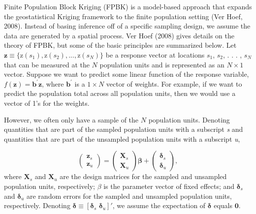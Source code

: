 \documentclass[]{elsarticle} %
\begin{document}
Finite Population Block Kriging (FPBK) is a model-based approach that
expands the geostatistical Kriging framework to the finite population
setting (Ver Hoef, 2008). Instead of basing inference off of a specific
sampling design, we assume the data are generated by a spatial process.
Ver Hoef (2008) gives details on the theory of FPBK, but some of the
basic principles are summarized below. Let
\(\mathbf{z} \equiv \{\text{z}(s_1), \text{z}(s_2), . . . , \text{z}(s_N) \}\)
be a response vector at locations \(s_1\), \(s_2\), . . . , \(s_N\) that
can be measured at the \(N\) population units and is represented as an
\(N \times 1\) vector. Suppose we want to predict some linear function
of the response variable,
\(f(\mathbf{z}) = \mathbf{b}^\prime \mathbf{z}\), where
\(\mathbf{b}^\prime\) is a \(1 \times N\) vector of weights. For
example, if we want to predict the population total across all
population units, then we would use a vector of 1's for the weights.

However, we often only have a sample of the \(N\) population units.
Denoting quantities that are part of the sampled population units with a
subscript \emph{s} and quantities that are part of the unsampled
population units with a subscript \emph{u},

\begin{equation}
\begin{pmatrix} \label{equation:Zmarginal}
    \mathbf{z}_s      \\
    \mathbf{z}_u
\end{pmatrix}
=
\begin{pmatrix}
  \mathbf{X}_s    \\
  \mathbf{X}_u
\end{pmatrix}
\bm{\beta} +
\begin{pmatrix}
\bm{\delta}_s    \\
\bm{\delta}_u
\end{pmatrix},
\end{equation} where \(\mathbf{X}_s\) and \(\mathbf{X}_u\) are the
design matrices for the sampled and unsampled population units,
respectively; \(\beta\) is the parameter vector of fixed effects; and
\(\bm{\delta}_s\) and \(\bm{\delta}_u\) are random errors for the
sampled and unsampled population units, respectively. Denoting
\(\bm{\delta} \equiv [\bm{\delta}_s \,\, \bm{\delta}_u]'\), we assume
the expectation of \(\bm{\delta}\) equals \(\mathbf{0}\).
\end{document}
